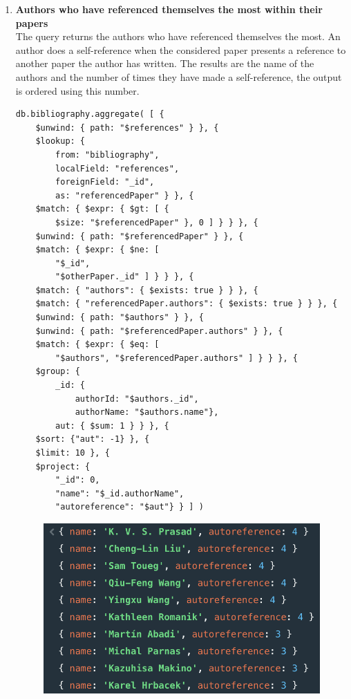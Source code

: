 \begin{enumerate}
\begin{figure}[H]
\begin{center}
            \label{fig:query10mongodb}%
        \end{center}
    \end{figure}
    \item \textbf{Authors who have referenced themselves the most within their papers} \\
    The query returns the authors who have referenced themselves the most.
    An author does a self-reference when the considered paper presents a reference to another paper the author has written.
    The results are the name of the authors and the number of times they have made a self-reference, the output is ordered using this number.
    \begin{lstlisting}[label={lst:query11mongodb}]
db.bibliography.aggregate( [ {
    $unwind: { path: "$references" } }, {
    $lookup: {
        from: "bibliography",
        localField: "references",
        foreignField: "_id",
        as: "referencedPaper" } }, {
    $match: { $expr: { $gt: [ {
        $size: "$referencedPaper" }, 0 ] } } }, {
    $unwind: { path: "$referencedPaper" } }, {
    $match: { $expr: { $ne: [
        "$_id",
        "$otherPaper._id" ] } } }, {
    $match: { "authors": { $exists: true } } }, {
    $match: { "referencedPaper.authors": { $exists: true } } }, {
    $unwind: { path: "$authors" } }, {
    $unwind: { path: "$referencedPaper.authors" } }, {
    $match: { $expr: { $eq: [
        "$authors", "$referencedPaper.authors" ] } } }, {
    $group: {
        _id: {
            authorId: "$authors._id",
            authorName: "$authors.name"},
        aut: { $sum: 1 } } }, {
    $sort: {"aut": -1} }, {
    $limit: 10 }, {
    $project: {
        "_id": 0,
        "name": "$_id.authorName",
        "autoreference": "$aut"} } ] )
    \end{lstlisting}
    \begin{figure}[H]
        \begin{center}
            \includegraphics[width=0.6\linewidth]{ImagesMongoDB/query11mongodb}
            \label{fig:query11mongodb}%
        \end{center}
    \end{figure}
\end{enumerate}
